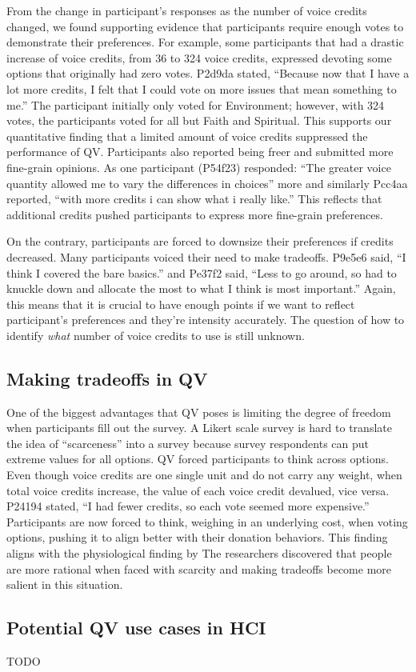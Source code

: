 From the change in participant's responses as the number of voice credits changed, we found supporting evidence that participants require enough votes to demonstrate their preferences.
For example, some participants that had a drastic increase of voice credits, from 36 to 324 voice credits, expressed devoting some options that originally had zero votes. 
P2d9da stated, ``Because now that I have a lot more credits, I felt that I could vote on more issues that mean something to me.'' The participant initially only voted for Environment; however, with 324 votes, the participants voted for all but Faith and Spiritual. This supports our quantitative finding that a limited amount of voice credits suppressed the performance of QV. Participants also reported being freer and submitted more fine-grain opinions. As one participant (P54f23) responded: ``The greater voice quantity allowed me to vary the differences in choices'' more and similarly Pcc4aa reported, ``with more credits i can show what i really like.''
This reflects that additional credits pushed participants to express more fine-grain preferences.

On the contrary, participants are forced to downsize their preferences if credits decreased. Many participants voiced their need to make tradeoffs. P9e5e6 said, ``I think I covered the bare basics.'' and Pe37f2 said, ``Less to go around, so had to knuckle down and allocate the most to what I think is most important.'' 
Again, this means that it is crucial to have enough points if we want to reflect participant's preferences and they're intensity accurately.
The question of how to identify \textit{what} number of voice credits to use is still unknown.

\subsection{Making tradeoffs in QV}
One of the biggest advantages that QV poses is limiting the degree of freedom when participants fill out the survey.
A Likert scale survey is hard to translate the idea of ``scarceness'' into a survey because survey respondents can put extreme values for all options. 
QV forced participants to think across options. 
Even though voice credits are one single unit and do not carry any weight, when total voice credits increase, the value of each voice credit devalued, vice versa. P24194 stated, ``I had fewer credits, so each vote seemed more expensive.''
Participants are now forced to think, weighing in an underlying cost, when voting options, pushing it to align better with their donation behaviors.
This finding aligns with the physiological finding by \textcite{Shah2015a}
The researchers discovered that people are more rational when faced with scarcity and making tradeoffs become more salient in this situation.

\subsection{Potential QV use cases in HCI}
TODO

